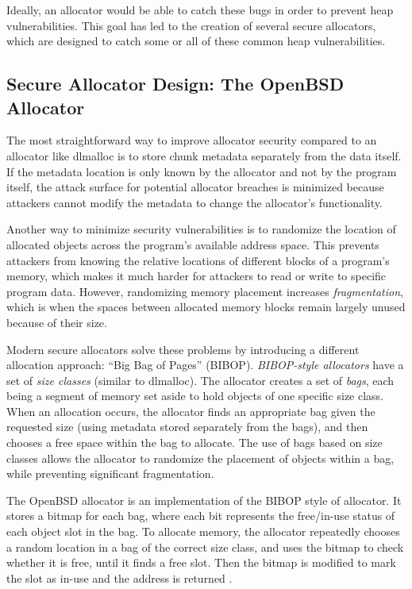 \documentclass[conference]{IEEEtran}
\begin{document}
Ideally, an allocator would be able to catch these bugs in order to prevent heap vulnerabilities.
This goal has led to the creation of several secure allocators, which are designed to catch some or all of these common heap vulnerabilities.

\subsection{Secure Allocator Design: The OpenBSD Allocator}

The most straightforward way to improve allocator security compared to an allocator like dlmalloc is to store chunk metadata separately from the data itself.
If the metadata location is only known by the allocator and not by the program itself, the attack surface for potential allocator breaches is minimized because attackers cannot modify the metadata to change the allocator's functionality.

Another way to minimize security vulnerabilities is to randomize the location of allocated objects across the program's available address space.
This prevents attackers from knowing the relative locations of different blocks of a program's memory, which makes it much harder for attackers to read or write to specific program data.
However, randomizing memory placement increases \emph{fragmentation}, which is when the spaces between allocated memory blocks remain largely unused because of their size.

Modern secure allocators solve these problems by introducing a different allocation approach: ``Big Bag of Pages'' (BIBOP).
\emph{BIBOP-style allocators} have a set of \emph{size classes} (similar to dlmalloc).
The allocator creates a set of \emph{bags}, each being a segment of memory set aside to hold objects of one specific size class.
When an allocation occurs, the allocator finds an appropriate bag given the requested size (using metadata stored separately from the bags), and then chooses a free space within the bag to allocate.
The use of bags based on size classes allows the allocator to randomize the placement of objects within a bag, while preventing significant fragmentation.

The OpenBSD allocator is an implementation of the BIBOP style of allocator.
It stores a bitmap for each bag, where each bit represents the free/in-use status of each object slot in the bag.
To allocate memory, the allocator repeatedly chooses a random location in a bag of the correct size class, and uses the bitmap to check whether it is free, until it finds a free slot.
Then the bitmap is modified to mark the slot as in-use and the address is returned \cite{freeguard}.
\end{document}
